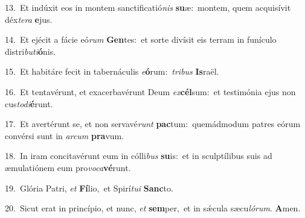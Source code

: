 {\numbfont\textcolor{\numbcolor}{13.}}~Et indúxit eos in montem sanctificatió\textit{nis} \textbf{su}\-æ:~\star montem, quem acquisívit déx\-\textit{te}\-\textit{ra} \textbf{e}\-jus.\par
{\numbfont\textcolor{\numbcolor}{14.}}~Et ejécit a fácie eó\textit{rum} \textbf{Gen}\-tes:~\star et sorte divísit eis terram in funículo distri\-\textit{bu}\-\textit{ti}\textbf{ó}nis.\par
{\numbfont\textcolor{\numbcolor}{15.}}~Et habitáre fecit in tabernáculis \textit{e}\-\textbf{ó}rum:~\star \textit{tri}\-\textit{bus} \textbf{Is}\-raël.\par
{\numbfont\textcolor{\numbcolor}{16.}}~Et tentavérunt, et exacerbavérunt Deum \textit{ex}\-\textbf{cél}sum:~\star et testimónia ejus non cus\-\textit{to}\-\textit{di}\textbf{é}runt.\par
{\numbfont\textcolor{\numbcolor}{17.}}~Et avertérunt se, et non servavé\textit{runt} \textbf{pac}\-tum:~\star quemádmodum patres eórum convérsi sunt in \textit{ar}\-\textit{cum} \textbf{pra}\-vum.\par
{\numbfont\textcolor{\numbcolor}{18.}}~In iram concitavérunt eum in cólli\textit{bus} \textbf{su}\-is:~\star et in sculptílibus suis ad æmulatiónem eum pro\-\textit{vo}\-\textit{ca}\textbf{vé}runt.\par
{\numbfont\textcolor{\numbcolor}{19.}}~Glória Patri, \textit{et} \textbf{Fí}\-lio,~\star et Spirí\-\textit{tu}\-\textit{i} \textbf{Sanc}\-to.\par
{\numbfont\textcolor{\numbcolor}{20.}}~Sicut erat in princípio, et nunc, \textit{et} \textbf{sem}\-per,~\star et in sǽcula sæcu\-\textit{ló}\-\textit{rum}. \textbf{A}\-men.\par

